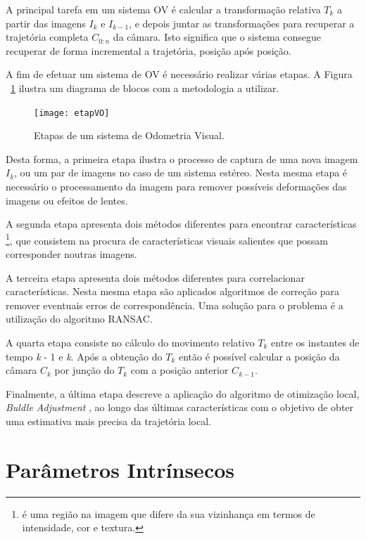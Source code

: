 A principal tarefa em um sistema OV é calcular a transformação relativa $T_k$ a partir das imagens $I_k$ e $I_{k-1}$, e depois juntar as transformações para recuperar a trajetória completa $C_{0:n}$ da câmara. Isto significa que o sistema consegue recuperar de forma incremental a trajetória, posição após posição.

A fim de efetuar um sistema de OV é necessário realizar várias etapas. A Figura ~\ref{fig:etapVO} ilustra um diagrama de blocos com a metodologia a utilizar.

\begin{figure}[h!] %
	\begin{center}
		\leavevmode		
		\texttt{[image: etapVO]}
		\caption{Etapas de um sistema de Odometria Visual.}
		\label{fig:etapVO}
	\end{center}
\end{figure}

Desta forma, a primeira etapa ilustra o processo de captura de uma nova imagem \textit{$I_k$}, ou um par de imagens no caso de um sistema estéreo. Nesta mesma etapa é necessário o processamento da imagem para remover possíveis deformações das imagens ou efeitos de lentes.

A segunda etapa apresenta dois métodos diferentes para encontrar características \footnote{é uma região na imagem que difere da sua vizinhança em termos de intensidade, cor e textura.}, que consistem na procura de características visuais salientes que possam corresponder noutras imagens.

A terceira etapa apresenta dois métodos diferentes para correlacionar características. Nesta mesma etapa são aplicados algoritmos de correção  para remover eventuais erros de correspondência. Uma solução para o problema é a utilização do algoritmo RANSAC.

A quarta etapa consiste no cálculo do movimento relativo $T_k$ entre os instantes de tempo \textit{k} - 1 e \textit{k}. Após a obtenção do $T_k$ então é possível calcular a posição da câmara $C_k$ por junção do $T_k$ com a posição anterior $C_{k-1}$.

Finalmente, a última etapa descreve a aplicação do algoritmo de otimização local, \textit{Buldle Adjustment} , ao longo das últimas características com o objetivo de obter uma estimativa mais precisa da trajetória local.


\section{Parâmetros Intrínsecos} \label{section:Intrin}

